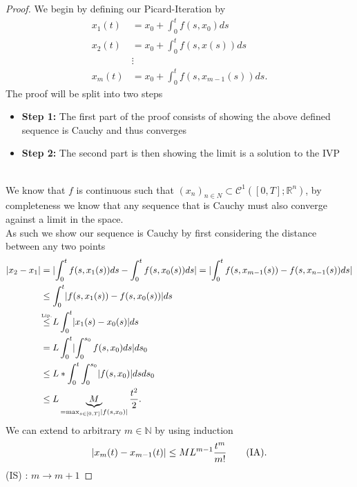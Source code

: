 \begin{proof}[Proof]
  We begin by defining our Picard-Iteration by 
  \begin{align*}
    x_1(t) &= x_0 + \int_0^{t }f(s,x_0) ds \\
    x_{2}(t) &= x_0 + \int_0^{t} f(s,x(s)) ds \\
             &\vdots \\
    x_m(t) &= x_0 + \int_0^{t} f(s,x_{m-1}(s)) ds 
  .\end{align*}
  The proof will be split into two steps 
  \begin{itemize}
   \item \textbf{Step 1:} The first part of the proof consists of showing the above defined sequence is Cauchy and thus converges
  \item \textbf{Step 2:} The second part is then showing the limit is a solution to the IVP
  \end{itemize}
  \newpage
  \hspace{0mm}\\
  We know that $f$ is continuous such that $(x_n)_{n \in  N} \subset \mathcal{C}^{1}([0,T];\mathbb{R}^{n} ) $, 
  by completeness we know that any sequence that is Cauchy must also converge against a limit in the space. \\[1ex]
  As such we show our sequence is Cauchy by first considering the distance between any two points
  \begin{align*}
    \abs{x_2 - x_1} &= \abs{\int_{0}^{t} f(s,x_{1}(s)) ds  -  \int_{0}^{t} f(s,x_{0}(s)) ds  } = \abs{\int_{0}^{t} f(s,x_{m-1}(s))  - f(s,x_{n-1}(s)) ds } \\
                    &\le \int_0^{t} \abs{f(s,x_{1}(s)) - f(s,x_{0}(s))} ds    \\ 
                    &\myS{Lip.}{\le }  L \int_0^{t} \abs{x_{1}(s) - x_{0}(s) } ds  \\
                    &= L \int_0^{t } \abs{\int_0^{s_0} f(s,x_0) ds} ds_0  \\
                    &\le L * \int_0^{t} \int_0^{s_0} \abs{f(s,x_0)} ds ds_0  \\
                    &\le L \underbrace{M}_{=\max_{s \in  [0,T]}\abs{f(s,x_0)}} \frac{t^2}{2}  
  .\end{align*}
  We can extend to arbitrary $m \in  \mathbb{N}$ by using induction  
  \begin{align*}
    \lvert x_m(t) - x_{m-1}(t)\rvert \le M L^{m-1} \frac{t^m}{m!}  \tag{IA}
  .\end{align*}
  (IS) :  $m \to  m+1$

\end{proof}
